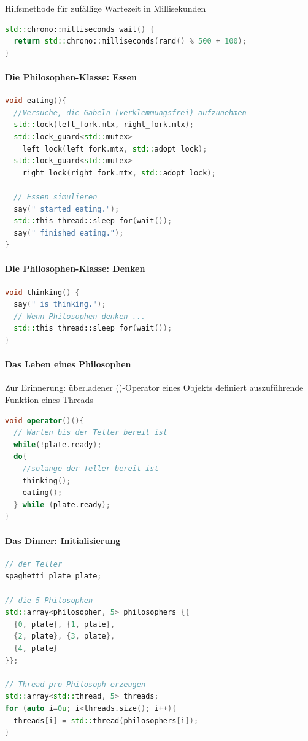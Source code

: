 \documentclass[10pt]{article}
\begin{document}
Hilfsmethode für zufällige Wartezeit in Millisekunden
\begin{lstlisting}[language=C++]
std::chrono::milliseconds wait() {
  return std::chrono::milliseconds(rand() % 500 + 100);
}
\end{lstlisting}

\paragraph{Die Philosophen-Klasse: Essen}
\begin{lstlisting}[language=C++]
void eating(){
  //Versuche, die Gabeln (verklemmungsfrei) aufzunehmen
  std::lock(left_fork.mtx, right_fork.mtx);
  std::lock_guard<std::mutex>
    left_lock(left_fork.mtx, std::adopt_lock);
  std::lock_guard<std::mutex>
    right_lock(right_fork.mtx, std::adopt_lock);
  
  // Essen simulieren
  say(" started eating.");
  std::this_thread::sleep_for(wait());
  say(" finished eating.");
}
\end{lstlisting}

\paragraph{Die Philosophen-Klasse: Denken}
\begin{lstlisting}[language=C++]
void thinking() {
  say(" is thinking.");
  // Wenn Philosophen denken ...
  std::this_thread::sleep_for(wait());
}
\end{lstlisting}

\paragraph{Das Leben eines Philosophen}

\begin{itemize*}
  \item Zur Erinnerung: überladener ()-Operator eines Objekts definiert auszuführende Funktion eines Threads
\end{itemize*}
\begin{lstlisting}[language=C++]
void operator()(){
  // Warten bis der Teller bereit ist
  while(!plate.ready);
  do{
    //solange der Teller bereit ist
    thinking();
    eating();
  } while (plate.ready);
}
\end{lstlisting}

\paragraph{Das Dinner: Initialisierung}
\begin{lstlisting}[language=C++]
// der Teller
spaghetti_plate plate;

// die 5 Philosophen
std::array<philosopher, 5> philosophers {{
  {0, plate}, {1, plate},
  {2, plate}, {3, plate},
  {4, plate}
}};

// Thread pro Philosoph erzeugen
std::array<std::thread, 5> threads;
for (auto i=0u; i<threads.size(); i++){
  threads[i] = std::thread(philosophers[i]);
}
\end{lstlisting}
\end{document}
